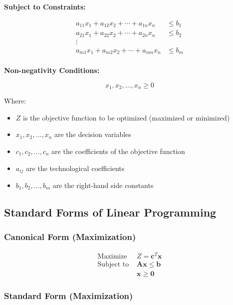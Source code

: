 \documentclass[
  letterpaper,
  DIV=11,
  numbers=noendperiod]{scrreprt}
\providecommand{\tightlist}{%
  \setlength{\itemsep}{0pt}\setlength{\parskip}{0pt}}
\begin{document}
\textbf{Subject to Constraints:}

\[
\begin{aligned}
a_{11}x_1 + a_{12}x_2 + \cdots + a_{1n}x_n & \leq b_1 \\
a_{21}x_1 + a_{22}x_2 + \cdots + a_{2n}x_n & \leq b_2 \\
\vdots & \\
a_{m1}x_1 + a_{m2}x_2 + \cdots + a_{mn}x_n & \leq b_m \\
\end{aligned}
\]

\textbf{Non-negativity Conditions:}

\[
x_1, x_2, \ldots, x_n \geq 0
\]

Where:

\begin{itemize}
\tightlist
\item
  \(Z\) is the objective function to be optimized (maximized or
  minimized)
\item
  \(x_1, x_2, \ldots, x_n\) are the decision variables
\item
  \(c_1, c_2, \ldots, c_n\) are the coefficients of the objective
  function
\item
  \(a_{ij}\) are the technological coefficients
\item
  \(b_1, b_2, \ldots, b_m\) are the right-hand side constants
\end{itemize}

\subsection{Standard Forms of Linear
Programming}\label{standard-forms-of-linear-programming}

\subsubsection{Canonical Form
(Maximization)}\label{canonical-form-maximization}

\[
\begin{aligned}
\text{Maximize } & Z = \mathbf{c}^T\mathbf{x} \\
\text{Subject to } & \mathbf{A}\mathbf{x} \leq \mathbf{b} \\
& \mathbf{x} \geq \mathbf{0}
\end{aligned}
\]

\subsubsection{Standard Form
(Maximization)}\label{standard-form-maximization}
\end{document}
